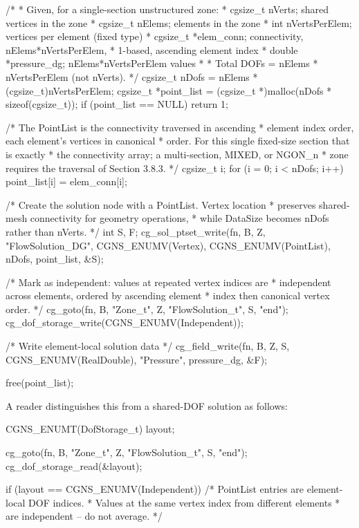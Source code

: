 \documentclass[11pt,letterpaper]{article}
\makeatletter
\let\cgns@orig@lstlisting\lstlisting
\let\cgns@endorig@lstlisting\endlstlisting
\renewenvironment{lstlisting}
  {\par\needspace{5\baselineskip}\nolinenumbers\cgns@orig@lstlisting}
  {\cgns@endorig@lstlisting\par\linenumbers}
\makeatother
\begin{document}
\begin{lstlisting}[language=C]
/*
 * Given, for a single-section unstructured zone:
 *   cgsize_t nVerts;         shared vertices in the zone
 *   cgsize_t nElems;         elements in the zone
 *   int      nVertsPerElem;  vertices per element (fixed type)
 *   cgsize_t *elem_conn;     connectivity, nElems*nVertsPerElem,
 *                            1-based, ascending element index
 *   double   *pressure_dg;   nElems*nVertsPerElem values
 *
 * Total DOFs = nElems * nVertsPerElem  (not nVerts).
 */
cgsize_t nDofs = nElems * (cgsize_t)nVertsPerElem;
cgsize_t *point_list = (cgsize_t *)malloc(nDofs * sizeof(cgsize_t));
if (point_list == NULL) return 1;

/* The PointList is the connectivity traversed in ascending
 * element index order, each element's vertices in canonical
 * order.  For this single fixed-size section that is exactly
 * the connectivity array; a multi-section, MIXED, or NGON_n
 * zone requires the traversal of Section 3.8.3. */
{
    cgsize_t i;
    for (i = 0; i < nDofs; i++)
        point_list[i] = elem_conn[i];
}

/* Create the solution node with a PointList.  Vertex location
 * preserves shared-mesh connectivity for geometry operations,
 * while DataSize becomes nDofs rather than nVerts. */
int S, F;
cg_sol_ptset_write(fn, B, Z, "FlowSolution_DG",
    CGNS_ENUMV(Vertex), CGNS_ENUMV(PointList),
    nDofs, point_list, &S);

/* Mark as independent: values at repeated vertex indices are
 * independent across elements, ordered by ascending element
 * index then canonical vertex order. */
cg_goto(fn, B, "Zone_t", Z, "FlowSolution_t", S, "end");
cg_dof_storage_write(CGNS_ENUMV(Independent));

/* Write element-local solution data */
cg_field_write(fn, B, Z, S, CGNS_ENUMV(RealDouble),
    "Pressure", pressure_dg, &F);

free(point_list);
\end{lstlisting}

A reader distinguishes this from a shared-DOF solution as follows:

\begin{lstlisting}[language=C]
CGNS_ENUMT(DofStorage_t) layout;

cg_goto(fn, B, "Zone_t", Z, "FlowSolution_t", S, "end");
cg_dof_storage_read(&layout);

if (layout == CGNS_ENUMV(Independent)) {
    /* PointList entries are element-local DOF indices.
     * Values at the same vertex index from different elements
     * are independent -- do not average. */
}
\end{lstlisting}
\end{document}
